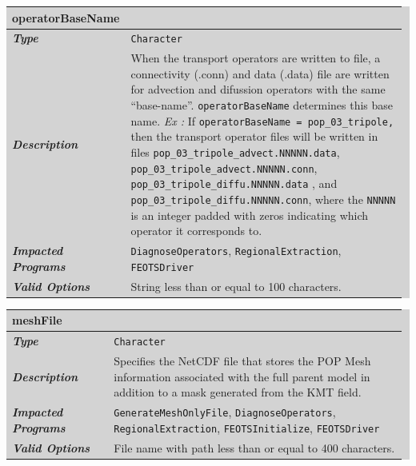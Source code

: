 \documentclass{softwaremanual}
\begin{document}
\noindent\begingroup\setlength{\fboxsep}{0pt}
\colorbox{lightgray}{
\begin{tabular}{p{0.25\linewidth} p{0.725\linewidth}}
\toprule
\textbf{operatorBaseName} & \\
\midrule
\textbf{\textit{Type}} & \texttt{Character} \\
\midrule
\textbf{\textit{Description}} & When the transport operators are written to file, a connectivity (.conn) and data (.data) file are written for advection and difussion operators with the same ``base-name''. \texttt{operatorBaseName} determines this base name. \textit{Ex :} If \texttt{operatorBaseName = pop\_03\_tripole,} then the transport operator files will be written in files \texttt{pop\_03\_tripole\_advect.NNNNN.data}, \texttt{pop\_03\_tripole\_advect.NNNNN.conn}, \texttt{pop\_03\_tripole\_diffu.NNNNN.data} , and \texttt{pop\_03\_tripole\_diffu.NNNNN.conn}, where the \texttt{NNNNN} is an integer padded with zeros indicating which operator it corresponds to.  \\
\midrule
\textbf{\textit{Impacted Programs}} & \texttt{DiagnoseOperators}, \texttt{RegionalExtraction}, \texttt{FEOTSDriver} \\
\midrule
\textbf{\textit{Valid Options}}  & String less than or equal to 100 characters. \\
\bottomrule
\end{tabular}
}\endgroup

\noindent\begingroup\setlength{\fboxsep}{0pt}
\colorbox{lightgray}{
\begin{tabular}{p{0.25\linewidth} p{0.725\linewidth}}
\toprule
\textbf{meshFile} & \\
\midrule
\textbf{\textit{Type}} & \texttt{Character} \\
\midrule
\textbf{\textit{Description}} & Specifies the NetCDF file that stores the POP Mesh information associated with the full parent model in addition to a mask generated from the KMT field.  \\
\midrule
\textbf{\textit{Impacted Programs}} & \texttt{GenerateMeshOnlyFile}, \texttt{DiagnoseOperators}, \texttt{RegionalExtraction}, \texttt{FEOTSInitialize}, \texttt{FEOTSDriver} \\
\midrule
\textbf{\textit{Valid Options}}  & File name with path less than or equal to 400 characters. \\
\bottomrule
\end{tabular}
}\endgroup
\end{document}
